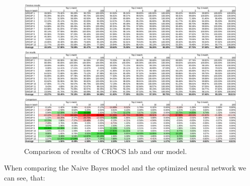 \begin{figure}

\centering
\includegraphics[width=\textwidth]{tex/images/results/comparison_13}
\caption{Comparison of results of CROCS lab and our model.}
\label{comparison-results}

\end{figure}

\noindent
When comparing the Naive Bayes model and the optimized neural network we can see, that:

